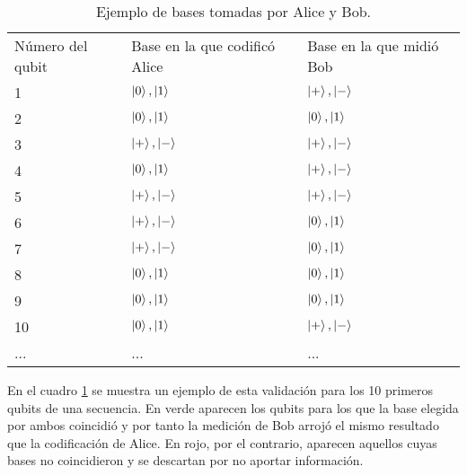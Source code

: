 \begin{table}[htb]
\begin{tabular}{lll}
\rowcolor[HTML]{FFFFC7} 
Número del qubit & Base en la que codificó Alice & Base en la que midió Bob \\ 
\rowcolor[HTML]{FD6864} 
1                                & $\left|0\right\rangle,\left|1\right\rangle$                 & $\left|+\right\rangle,\left|-\right\rangle$            \\ 
\rowcolor[HTML]{9AFF99} 
2                                & $\left|0\right\rangle,\left|1\right\rangle$                 & $\left|0\right\rangle,\left|1\right\rangle$            \\ 
\rowcolor[HTML]{9AFF99} 
3                                & $\left|+\right\rangle,\left|-\right\rangle$                 & $\left|+\right\rangle,\left|-\right\rangle$            \\ 
\rowcolor[HTML]{FD6864} 
4                                & $\left|0\right\rangle,\left|1\right\rangle$                 & $\left|+\right\rangle,\left|-\right\rangle$            \\ 
\rowcolor[HTML]{9AFF99} 
5                                & $\left|+\right\rangle,\left|-\right\rangle$                 & $\left|+\right\rangle,\left|-\right\rangle$            \\ 
\rowcolor[HTML]{FD6864} 
6                                & $\left|+\right\rangle,\left|-\right\rangle$                 & $\left|0\right\rangle,\left|1\right\rangle$            \\ 
\rowcolor[HTML]{FD6864} 
7                                & $\left|+\right\rangle,\left|-\right\rangle$                 & $\left|0\right\rangle,\left|1\right\rangle$            \\ 
\rowcolor[HTML]{9AFF99} 
8                                & $\left|0\right\rangle,\left|1\right\rangle$                 & $\left|0\right\rangle,\left|1\right\rangle$            \\ 
\rowcolor[HTML]{9AFF99} 
9                                & $\left|0\right\rangle,\left|1\right\rangle$                 & $\left|0\right\rangle,\left|1\right\rangle$            \\ 
\rowcolor[HTML]{FD6864} 
10                               & $\left|0\right\rangle,\left|1\right\rangle$                 & $\left|+\right\rangle,\left|-\right\rangle$            \\ 
\rowcolor[HTML]{FFFFC7} 
...                              & ...                           & ...                      \\ 
\end{tabular}
\caption{Ejemplo de bases tomadas por Alice y Bob.}
\label{tab:tab21}
\end{table}

En el cuadro \ref{tab:tab21} se muestra un ejemplo de esta validación para los 10 primeros qubits de una secuencia. En verde aparecen los qubits para los que la base elegida por ambos coincidió y por tanto la medición de Bob arrojó el mismo resultado que la codificación de Alice. En rojo, por el contrario, aparecen aquellos cuyas bases no coincidieron y se descartan por no aportar información.

